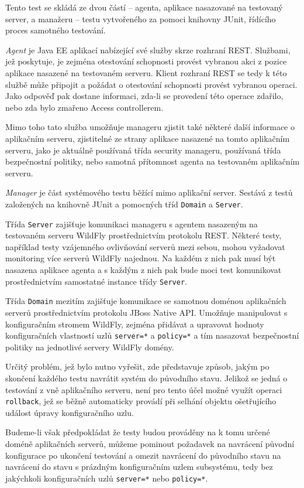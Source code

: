 Tento test se skládá ze dvou částí -- agenta, aplikace nasazované na testovaný server, a manažeru -- testu vytvořeného za pomoci knihovny JUnit, řídícího proces samotného testování.

{\it Agent} je Java EE aplikací nabízející své služby skrze rozhraní REST. Službami, jež poskytuje, je zejména otestování schopnosti provést vybranou akci z pozice aplikace nasazené na testovaném serveru. Klient rozhraní REST se tedy k této službě může připojit a požádat o otestování schopnosti provést vybranou operaci. Jako odpověď pak dostane informaci, zda-li se provedení této operace zdařilo, nebo zda bylo zmařeno Access controllerem.

Mimo toho tato služba umožňuje manageru zjistit také některé další informace o aplikačním serveru, zjistitelné ze strany aplikace nasazené na tomto aplikačním serveru, jako je aktuálně používaná třída security manageru, používaná třída bezpečnostní politiky, nebo samotná přítomnost agenta na testovaném aplikačním serveru.

{\it Manager} je část systémového testu běžící mimo aplikační server. Sestává z testů založených na knihovně JUnit a pomocných tříd {\tt Domain} a {\tt Server}.

Třída {\tt Server} zajišťuje komunikaci manageru s agentem nasazeným na testovaném serveru WildFly prostřednictvím protokolu REST. Některé testy, například testy vzájemného ovlivňování serverů mezi sebou, mohou vyžadovat monitoring více serverů WildFly najednou. Na každém z nich pak musí být nasazena aplikace agenta a s každým z nich pak bude moci test komunikovat prostřednictvím samostatné instance třídy {\tt Server}.

Třída {\tt Domain} mezitím zajišťuje komunikace se samotnou doménou aplikačních serverů prostřednictvím protokolu JBoss Native API. Umožňuje manipulovat s konfiguračním stromem WildFly, zejména přidávat a upravovat hodnoty konfiguračních vlastností uzlů {\tt server=*} a {\tt policy=*} a tím nasazovat bezpečnostní politiky na jednotlivé servery WildFly domény.

Určitý problém, jež bylo nutno vyřešit, zde představuje způsob, jakým po skončení každého testu navrátit systém do původního stavu. Jelikož se jedná o testování z vně aplikačního serveru, není pro tento účel možné využít operaci {\tt rollback}, jež se běžně automaticky provádí při selhání objektu ošetřujícího událost úpravy konfiguračního uzlu.

Budeme-li však předpokládat že testy budou prováděny na k tomu určené doméně aplikačních serverů, můžeme pominout požadavek na navrácení původní konfigurace po ukončení testování a omezit navrácení do původního stavu na navrácení do stavu s prázdným konfiguračním uzlem subsystému, tedy bez jakýchkoli konfiguračních uzlů 
{\tt server=*} nebo {\tt policy=*}.

